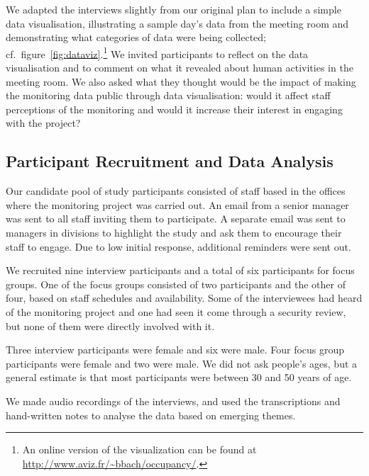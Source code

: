 We adapted the interviews slightly from our
original plan to include a simple data visualisation, illustrating
a sample day’s data from the meeting room and demonstrating what categories of data were being
collected; cf.\ 
figure~\ref{fig:dataviz}.\footnote{
An online version of the visualization can be found at \url{http://www.aviz.fr/~bbach/occupancy/}.
}
We invited participants to reflect on the data visualisation and to
comment on what it revealed about human activities in the meeting
room. We also asked what they thought would be the impact of making
the monitoring data public through data visualisation: would it affect
staff perceptions of the monitoring and would it increase their
interest in engaging with the project?

\subsection{Participant Recruitment and Data Analysis}
\label{sec:recruitment}

Our candidate pool of study participants consisted of staff based in
the offices where the monitoring project was carried out. An email
from a senior manager was sent to all staff inviting them to
participate. A separate email was sent to managers in divisions to
highlight the study and ask them to encourage their staff to engage.
Due to low initial response, additional reminders were sent out.

We recruited nine interview participants and a total of six
participants for focus groups. One of the focus groups consisted of
two participants and the other of four, based on staff schedules and
availability. Some of the interviewees had heard of the monitoring
project and one had seen it come through a security review, but none
of them were directly involved with it.

Three interview participants were female and six
were male. Four focus group participants were female and two were
male. We did not ask people’s ages, but a general estimate is that
most participants were between 30 and 50 years of age.

We made audio recordings of the interviews, and used the
transcriptions and hand-written notes to analyse the data based on emerging themes.

